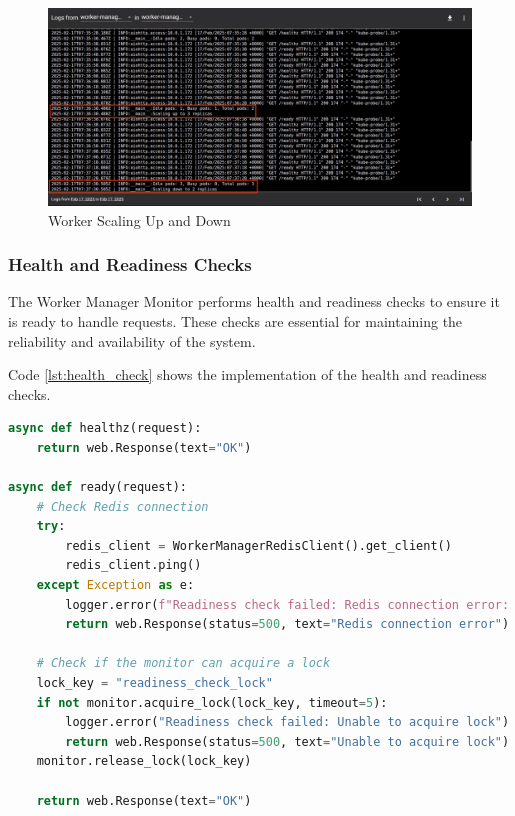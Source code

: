 \begin{figure}[ht]
  \centering
  \includegraphics[width=\textwidth]{figures/worker_scaling_up_down.png}
  \caption{Worker Scaling Up and Down}
  \label{fig:worker_scaling_up_down}
\end{figure}

\subsubsection{Health and Readiness Checks}
The Worker Manager Monitor performs health and readiness checks to ensure it is ready to handle requests. These checks are essential for maintaining the reliability and availability of the system. 

Code \ref{lst:health_check} shows the implementation of the health and readiness checks.

\begin{lstlisting}[language=python, caption={Worker Manager Monitor Health and Readiness Checks}, label={lst:health_check}]
async def healthz(request):
    return web.Response(text="OK")

async def ready(request):
    # Check Redis connection
    try:
        redis_client = WorkerManagerRedisClient().get_client()
        redis_client.ping()
    except Exception as e:
        logger.error(f"Readiness check failed: Redis connection error: {str(e)}")
        return web.Response(status=500, text="Redis connection error")

    # Check if the monitor can acquire a lock
    lock_key = "readiness_check_lock"
    if not monitor.acquire_lock(lock_key, timeout=5):
        logger.error("Readiness check failed: Unable to acquire lock")
        return web.Response(status=500, text="Unable to acquire lock")
    monitor.release_lock(lock_key)

    return web.Response(text="OK")
\end{lstlisting}

